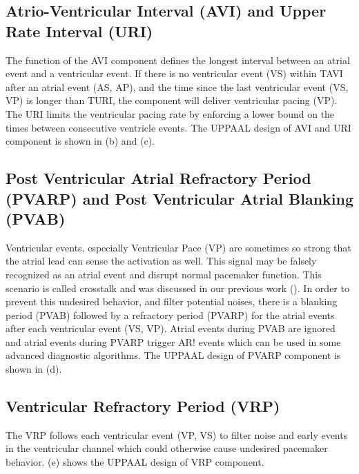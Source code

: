 \subsection{Atrio-Ventricular Interval (AVI) and Upper Rate Interval (URI)}
The function of the AVI component defines the longest interval between an atrial event and a ventricular event. If there is no ventricular event \textsf{(VS)}  within TAVI after an atrial event \textsf{(AS, AP)}, and the time since the last ventricular event \textsf{(VS, VP)} is longer than TURI, the component will deliver ventricular pacing \textsf{(VP)}. The URI limits the ventricular pacing rate by enforcing a lower bound on the times between consecutive ventricle events. The UPPAAL design of AVI and URI component is shown in (b) and (c).%

\subsection{Post Ventricular Atrial Refractory Period (PVARP) and Post Ventricular Atrial Blanking (PVAB)}
Ventricular events, especially Ventricular Pace \textsf{(VP)} are sometimes so strong that the atrial lead can sense the activation as well. This signal may be falsely recognized as an atrial event and disrupt normal pacemaker function. This scenario is called crosstalk and was discussed in our previous work (\cite{vhm_embc11}). In order to prevent this undesired behavior, and filter potential noises, there is a blanking period (PVAB) followed by a refractory period (PVARP) for the atrial events after each ventricular event \textsf{(VS, VP)}. Atrial events during PVAB are ignored and atrial events during PVARP trigger \textsf{AR!} events which can be used in some advanced diagnostic algorithms. The UPPAAL design of PVARP component is shown in (d).

\subsection{Ventricular Refractory Period (VRP)}
The VRP follows each ventricular event \textsf{(VP, VS)} to filter noise and early events in the ventricular channel which could otherwise cause undesired pacemaker behavior. (e) shows the UPPAAL design of VRP component.

